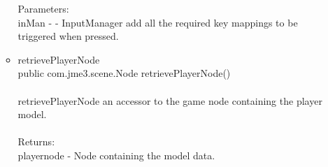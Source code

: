 \documentclass[letterpaper]{article}
\begin{document}
\begin{itemize}
\begin{itemize}
													Parameters: \\
													inMan - - InputManager add all the required key mappings to be triggered when pressed.
											\item	retrievePlayerNode \\
													public com.jme3.scene.Node retrievePlayerNode() \\ \\
													retrievePlayerNode an accessor to the game node containing the player model. \\ \\
													Returns: \\
													playernode - Node containing the model data.
										\end{itemize}
							\end{itemize}
						
						\vspace{0.2in}
\end{document}
